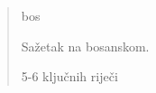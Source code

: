 \begin{abstract}
    \markboth{\abstractname}{}
\begin{scontents}[store-env=lang]
bos
\end{scontents}
\begin{scontents}[store-env=abstracts,print-env=true]
Sažetak na bosanskom.
\end{scontents}

\begin{scontents}[store-env=keywords,print-env=true]
5-6 ključnih riječi
\end{scontents}
\end{abstract}
\cleardoublepage
{}
